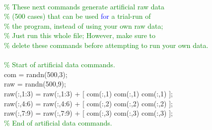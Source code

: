 \hspace{1mm}\indent \indent \indent \indent \indent  \\ 
\hspace{1mm}\indent \indent \indent \indent \indent \textcolor{green}{\%  These next commands generate artificial raw data  }\\ 
\hspace{1mm}\indent \indent \indent \indent \indent \textcolor{green}{\%  (500 cases) that can be used \textcolor{blue}{for} a trial-run of }\\ 
\hspace{1mm}\indent \indent \indent \indent \indent \indent \textcolor{green}{\%  the program, instead of using your own raw data;  }\\ 
\hspace{1mm}\indent \indent \indent \indent \indent \indent \textcolor{green}{\%  Just run this whole file; However, make sure to }\\ 
\hspace{1mm}\indent \indent \indent \indent \indent \indent \textcolor{green}{\%  delete these commands before attempting to run your own data. }\\ 
\hspace{1mm}\indent \indent \indent \indent \indent \indent  \\ 
\hspace{1mm}\indent \indent \indent \indent \indent \indent \textcolor{green}{\% Start of artificial data commands. }\\ 
\hspace{1mm}\indent \indent \indent \indent \indent \indent com = randn(500,3); \\ 
\hspace{1mm}\indent \indent \indent \indent \indent \indent raw = randn(500,9); \\ 
\hspace{1mm}\indent \indent \indent \indent \indent \indent raw(:,1:3) = raw(:,1:3) + [ com(:,1) com(:,1) com(:,1) ]; \\ 
\hspace{1mm}\indent \indent \indent \indent \indent \indent raw(:,4:6) = raw(:,4:6) + [ com(:,2) com(:,2) com(:,2) ]; \\ 
\hspace{1mm}\indent \indent \indent \indent \indent \indent raw(:,7:9) = raw(:,7:9) + [ com(:,3) com(:,3) com(:,3) ]; \\ 
\hspace{1mm}\indent \indent \indent \indent \indent \indent \textcolor{green}{\% End of artificial data commands. }\\ 
